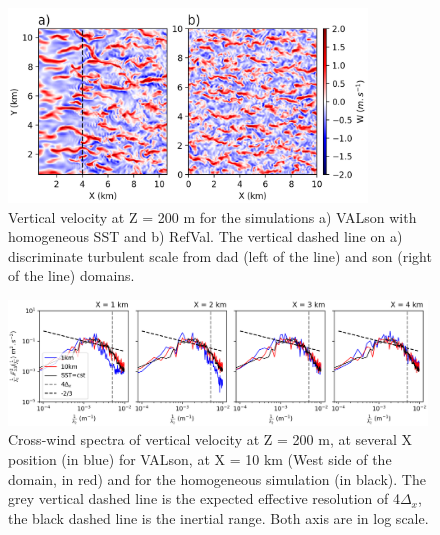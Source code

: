 \documentclass[draft]{agujournal2019} %
\begin{document}
            \begin{figure}[h]
				\centering
				\includegraphics[width=0.85\textwidth]{Overview_W_atZ200m_nest_homo_c.png}
				\caption{Vertical velocity at Z = 200 m for the simulations a) VALson with homogeneous SST and b) RefVal. The vertical dashed line on a) discriminate turbulent scale from dad (left of the line) and son (right of the line) domains.}
				\label{VAL_homo_WT_200m}
			\end{figure}
   
            \begin{figure}[h]
				\centering
				\includegraphics[width=0.99\textwidth]{KPSD_W_atZ200_X1234vs10km.png}
				\caption{Cross-wind spectra of vertical velocity at Z = 200 m, at several X position (in blue) for VALson, at X = 10 km (West side of the domain, in red) and for the homogeneous simulation (in black). The grey vertical dashed line is the expected effective resolution of 4$\Delta_x$, the black dashed line is the inertial range. Both axis are in log scale.}
				\label{VAL_homo_spectra_several_X}
			\end{figure} 
            
\end{document}

